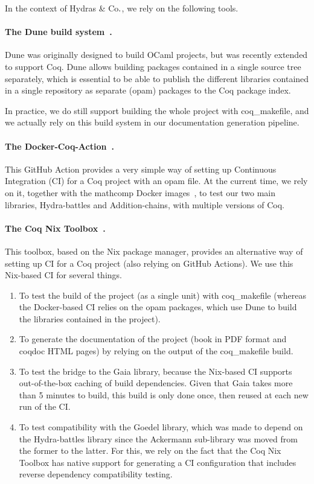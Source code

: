 \documentclass{easychair}
\newcommand{\Hydras}{Hydras \& Co$\text.$\xspace}
\begin{document}
In the context of \Hydras, we rely on the following tools.

\paragraph{The Dune build system~\cite{dune}.}
Dune was originally designed to build OCaml projects, but was recently extended to support Coq. Dune allows building packages contained in a single source tree separately, which is essential to be able to publish the different libraries contained in a single repository as separate (opam) packages to the Coq package index.

In practice, we do still support building the whole project with coq\_makefile, and we actually rely on this build system in our documentation generation pipeline.

\paragraph{The Docker-Coq-Action~\cite{martindorel2020dockercoq}.}
This GitHub Action provides a very simple way of setting up Continuous Integration (CI) for a Coq project with an opam file.
%
At the current time, we rely on it, together with the mathcomp Docker images~\cite{mathcompdocker}, to test our two main libraries, Hydra-battles and Addition-chains, with multiple versions of Coq.

\paragraph{The Coq Nix Toolbox~\cite{cohen:hal-03366644}.}
This toolbox, based on the Nix package manager, provides an alternative way of setting up CI for a Coq project (also relying on GitHub Actions).
%
We use this Nix-based CI for several things.

\begin{enumerate}
\item To test the build of the project (as a single unit) with coq\_makefile (whereas the Docker-based CI relies on the opam packages, which use Dune to build the libraries contained in the project).

\item To generate the documentation of the project (book in PDF format and coqdoc HTML pages) by relying on the output of the coq\_makefile build.

\item To test the bridge to the Gaia library, because the Nix-based CI supports out-of-the-box caching of build dependencies.
%
Given that Gaia takes more than 5 minutes to build, this build is only done once, then reused at each new run of the CI.

\item To test compatibility with the Goedel library, which was made to depend on the Hydra-battles library since the Ackermann sub-library was moved from the former to the latter.
%
For this, we rely on the fact that the Coq Nix Toolbox has native support for generating a CI configuration that includes reverse dependency compatibility testing.
\end{enumerate}
\end{document}
